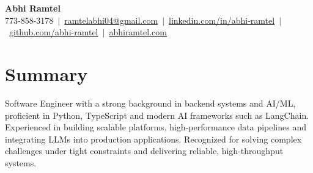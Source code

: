 \documentclass[letterpaper,10.5pt]{article}
\begin{document}

\begin{center}
  {\LARGE\bfseries Abhi Ramtel}\\\vspace{2pt}
  \small
  773-858-3178\ $|$\
  \href{mailto:ramtelabhi04@gmail.com}{ramtelabhi04@gmail.com}\ $|$\
  \href{https://linkedin.com/in/abhi-ramtel}{linkedin.com/in/abhi-ramtel}\ $|$\
  \href{https://github.com/abhi-ramtel}{github.com/abhi-ramtel}\ $|$\
  \href{https://abhiramtel.com}{abhiramtel.com}
\end{center}
\vspace{-15pt}

\section{Summary}
\vspace{-2pt}
\small{Software Engineer with a strong background in backend systems and AI/ML, proficient in Python, TypeScript and modern AI frameworks such as LangChain. Experienced in building scalable platforms, high-performance data pipelines and integrating LLMs into production applications. Recognized for solving complex challenges under tight constraints and delivering reliable, high-throughput systems.}
\end{document}
